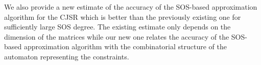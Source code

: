 We also provide
a new estimate of the accuracy of the SOS-based approximation algorithm for the CJSR which is better
than the previously existing one for sufficiently large SOS degree.
The existing estimate only depends on the dimension of the matrices
while our new one relates the accuracy of the SOS-based approximation algorithm with the combinatorial structure of the automaton representing the constraints.
